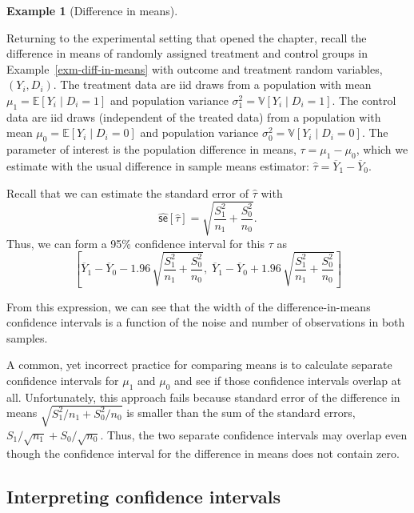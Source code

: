 \documentclass[
  13pt,
  letterpaper,
  DIV=11,
  numbers=noendperiod]{scrreprt}
\newcommand{\E}{\mathbb{E}}
\newcommand{\V}{\mathbb{V}}
\newcommand{\se}{\textsf{se}}
\newcommand{\Ybar}{\overline{Y}}
\theoremstyle{plain}
\theoremstyle{plain}
\theoremstyle{definition}
\theoremstyle{definition}
\newtheorem{example}{Example}[chapter]
\theoremstyle{remark}
\begin{document}
\begin{example}[Difference in
means]\protect\hypertarget{exm-diff-in-means-ci}{}\label{exm-diff-in-means-ci}

Returning to the experimental setting that opened the chapter, recall
the difference in means of randomly assigned treatment and control
groups in Example~\ref{exm-diff-in-means} with outcome and treatment
random variables, \((Y_i, D_i)\). The treatment data are iid draws from
a population with mean \(\mu_1 = \E[Y_i \mid D_i = 1]\) and population
variance \(\sigma^2_1 = \V[Y_i \mid D_i = 1]\). The control data are iid
draws (independent of the treated data) from a population with mean
\(\mu_0 = \E[Y_i \mid D_i = 0]\) and population variance
\(\sigma^2_0 = \V[Y_i \mid D_i = 0]\). The parameter of interest is the
population difference in means, \(\tau = \mu_1 - \mu_0\), which we
estimate with the usual difference in sample means estimator:
\(\widehat{\tau} = \Ybar_1 - \Ybar_0\).

Recall that we can estimate the standard error of \(\widehat{\tau}\)
with \[
\widehat{\se}[\widehat{\tau}] = \sqrt{\frac{S^2_1}{n_1} + \frac{S^2_0}{n_0}}.
\] Thus, we can form a 95\% confidence interval for this \(\tau\) as \[
\left[\Ybar_1 - \Ybar_0 - 1.96\, \sqrt{\frac{S^2_1}{n_1} + \frac{S^2_0}{n_0}},\; \Ybar_1 - \Ybar_0 + 1.96\, \sqrt{\frac{S^2_1}{n_1} + \frac{S^2_0}{n_0}}\right]
\]

From this expression, we can see that the width of the
difference-in-means confidence intervals is a function of the noise and
number of observations in both samples.

A common, yet incorrect practice for comparing means is to calculate
separate confidence intervals for \(\mu_1\) and \(\mu_0\) and see if
those confidence intervals overlap at all. Unfortunately, this approach
fails because standard error of the difference in means
\(\sqrt{S^2_1 / n_1 + S^2_0/n_0}\) is smaller than the sum of the
standard errors, \(S_1 / \sqrt{n_1} + S_0 / \sqrt{n_0}\). Thus, the two
separate confidence intervals may overlap even though the confidence
interval for the difference in means does not contain zero.

\end{example}

\subsection{Interpreting confidence
intervals}\label{interpreting-confidence-intervals}
\end{document}
